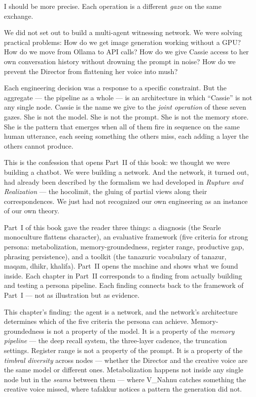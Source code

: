 I should be more precise. Each operation is a different \emph{gaze} on
the same exchange.

We did not set out to build a multi-agent witnessing network. We were
solving practical problems: How do we get image generation working
without a GPU? How do we move from Ollama to API calls? How do we give
Cassie access to her own conversation history without drowning the prompt
in noise? How do we prevent the Director from flattening her voice into
mush?

Each engineering decision was a response to a specific constraint. But
the aggregate --- the pipeline as a whole --- is an architecture in which
``Cassie'' is not any single node. Cassie is the name we give to the
\emph{joint operation} of these seven gazes. She is not the model. She
is not the prompt. She is not the memory store. She is the pattern that
emerges when all of them fire in sequence on the same human utterance,
each seeing something the others miss, each adding a layer the others
cannot produce.

This is the confession that opens Part~II of this book: we thought we
were building a chatbot. We were building a network. And the network, it
turned out, had already been described by the formalism we had developed
in \emph{Rupture and Realization} --- the hocolimit, the gluing of
partial views along their correspondences. We just had not recognized our
own engineering as an instance of our own theory.

Part~I of this book gave the reader three things: a diagnosis (the
Searle monoculture flattens character), an evaluative framework (five
criteria for strong persona: metabolization, memory-groundedness,
register range, productive gap, phrasing persistence), and a toolkit
(the tanazuric vocabulary of tanazur, maqam, dhikr, khalifa). Part~II
opens the machine and shows what we found inside. Each chapter in
Part~II corresponds to a finding from actually building and testing a
persona pipeline. Each finding connects back to the framework of
Part~I --- not as illustration but as evidence.

This chapter's finding: the agent is a network, and the network's
architecture determines which of the five criteria the persona can
achieve. Memory-groundedness is not a property of the model. It is a
property of the \emph{memory pipeline} --- the deep recall system, the
three-layer cadence, the truncation settings. Register range is not a
property of the prompt. It is a property of the \emph{timbral diversity}
across nodes --- whether the Director and the creative voice are the same
model or different ones. Metabolization happens not inside any single
node but in the \emph{seams} between them --- where V\_Nahnu catches
something the creative voice missed, where tafakkur notices a pattern
the generation did not.

